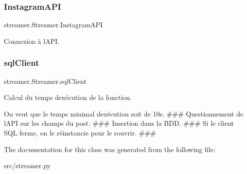 \subsubsection{\texorpdfstring{Instagram\+A\+PI}{InstagramAPI}}
{\footnotesize\ttfamily streamer.\+Streamer.\+Instagram\+A\+PI}



Connexion à l\textquotesingle{}A\+PI. 

\paragraph*{}\mbox{\label{classstreamer_1_1_streamer_ae7cbab4c93f54faa038805789506e167}} 
\subsubsection{\texorpdfstring{sql\+Client}{sqlClient}}
{\footnotesize\ttfamily streamer.\+Streamer.\+sql\+Client}



Calcul du temps d\textquotesingle{}exécution de la fonction. 

On veut que le temps minimal d\textquotesingle{}exécution soit de 10s. \#\#\# Questionnement de l\textquotesingle{}A\+PI sur les champs du post. \#\#\# Insertion dans la B\+DD. \#\#\# Si le client S\+QL ferme, on le réinstancie pour le rouvrir. \#\#\# 

The documentation for this class was generated from the following file\+:\begin{DoxyCompactItemize}
\item 
src/streamer.\+py\end{DoxyCompactItemize}
